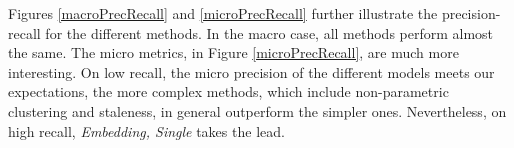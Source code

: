 \documentclass{article}
\begin{document}
Figures \ref{macroPrecRecall} and \ref{microPrecRecall} further illustrate the precision-recall for the different methods. In the macro case, all methods perform almost the same. The micro metrics, in Figure \ref{microPrecRecall}, are much more interesting. On low recall, the micro precision of the different models meets our expectations, the more complex methods, which include non-parametric clustering and staleness, in general outperform the simpler ones. Nevertheless, on high recall, {\textit{Embedding, Single}} takes the lead.





\end{document}
